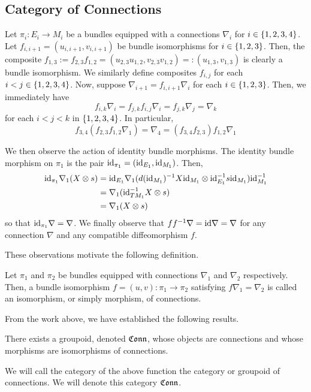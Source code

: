 \documentclass[./Thick_TQFTs_and_Quantum_Information.tex]{subfiles}
\begin{document}
\subsection{Category of Connections}

Let $\pi_i : E_i \to M_i$ be a bundles equipped with a connections $\nabla_i$
for $i \in \set{1, 2, 3, 4}$. Let $f_{i, i + 1} = (u_{i, i + 1}, v_{i, i + 1})$
be bundle isomorphisms for $i \in \set{1, 2, 3}$. Then, the composite
$f_{1, 3} := f_{2, 3}f_{1, 2} = (u_{2, 3}u_{1, 2}, v_{2, 3}v_{1, 2})
=: (u_{1, 3}, v_{1, 3})$ is clearly a bundle isomorphism. We similarly define
composites $f_{i, j}$ for each $i < j \in \set{1, 2, 3, 4}$. Now, suppose
$\nabla_{i + 1} = f_{i, i + 1}\nabla_i$ for each $i \in \set{1, 2, 3}$. Then, we
immediately have
\[
  f_{i, k}\nabla_i = f_{j, k}f_{i, j}\nabla_i = f_{j, k}\nabla_j = \nabla_k
\]
for each $i < j < k$ in $\set{1, 2, 3, 4}$. In particular,
\[
  f_{3, 4}(f_{2, 3}f_{1, 2}\nabla_1) = \nabla_4
    = (f_{3, 4}f_{2, 3})f_{1, 2}\nabla_1
\]

We then observe the action of identity bundle morphisms. The identity bundle
morphism on $\pi_1$ is the pair $\text{id}_{\pi_1} = (\text{id}_{E_1}, \text{id}_{M_1})$. Then,
\begin{align*}
   \text{id}_{\pi_1}\nabla_1(X \otimes s)
&= \text{id}_{E_1}\nabla_1(d(\text{id}_{M_1})^{-1}X\text{id}_{M_1}
                     \otimes \text{id}_{E_1}^{-1}s\text{id}_{M_1})\text{id}_{M_1}^{-1} \\
&= \nabla_1(\text{id}_{TM_1}^{-1}X \otimes s) \\
&= \nabla_1(X \otimes s)
\end{align*}
so that $\text{id}_{\pi_1}\nabla = \nabla$. We finally observe that
$ff^{-1}\nabla = \text{id}\nabla = \nabla$ for any connection $\nabla$ and any
compatible diffeomorphism $f$.

These observations motivate the following definition.
\begin{defn}
Let $\pi_1$ and $\pi_2$ be bundles equipped with connections $\nabla_1$ and
$\nabla_2$ respectively. Then, a bundle isomorphism
$f = (u, v) : \pi_1 \to \pi_2$ satisfying $f\nabla_1 = \nabla_2$ is called an
isomorphism, or simply morphism, of connections.
\end{defn}

From the work above, we have established the following results.
\begin{thm}
There exists a groupoid, denoted $\mathfrak{Conn}$, whose objects are connections and
whose morphisms are isomorphisms of connections.
\end{thm}
\begin{defn}
We will call the category of the above function the category or groupoid of
connections. We will denote this category $\mathfrak{Conn}$.
\end{defn}
\end{document}
